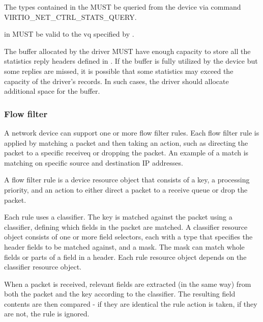 
The types contained in the  MUST be queried from the device
via command VIRTIO_NET_CTRL_STATS_QUERY.

 in  MUST be valid to the
vq specified by .

The  buffer allocated by the driver MUST have
enough capacity to store all the statistics reply headers defined in
. If the
 buffer is fully utilized by the device but some
replies are missed, it is possible that some statistics may exceed the capacity
of the driver's records. In such cases, the driver should allocate additional
space for the  buffer.

\subsubsection{Flow filter}\label{sec:Device Types / Network Device / Device Operation / Flow filter}

A network device can support one or more flow filter rules. Each flow filter rule
is applied by matching a packet and then taking an action, such as directing the packet
to a specific receiveq or dropping the packet. An example of a match is
matching on specific source and destination IP addresses.

A flow filter rule is a device resource object that consists of a key,
a processing priority, and an action to either direct a packet to a
receive queue or drop the packet.

Each rule uses a classifier. The key is matched against the packet using
a classifier, defining which fields in the packet are matched.
A classifier resource object consists of one or more field selectors, each with
a type that specifies the header fields to be matched against, and a mask.
The mask can match whole fields or parts of a field in a header. Each
rule resource object depends on the classifier resource object.

When a packet is received, relevant fields are extracted
(in the same way) from both the packet and the key according to the
classifier. The resulting field contents are then compared -
if they are identical the rule action is taken, if they are not, the rule is ignored.

